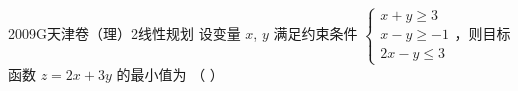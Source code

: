 
\begin{problem}{2009}{G}{天津卷（理）}{2}{线性规划}
设变量 $x$, $y$ 满足约束条件 $\begin{cases} x+y\geq 3 \\ x-y\geq -1 \\ 2x-y\leq 3 \end{cases}$，则目标函数 $z=2x+3y$ 的最小值为 \hspace{1cm} （ ）
\begin{choices}
\end{choices}
\end{problem}

\begin{answer}

\end{answer}

\begin{solutions}

\end{solutions}